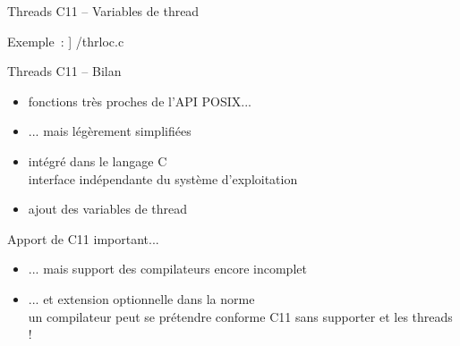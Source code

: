 \begin {frame} [fragile] {Threads C11 -- Variables de thread}

    Exemple~:
    \scriptsize\lstmonstyle] {\inc/thrloc.c}

\end{frame}

\begin {frame} {Threads C11 -- Bilan}
    \begin {itemize}
	\item fonctions très proches de l'API POSIX...
	\item ... mais légèrement simplifiées
	\item intégré dans le langage C \\
	    \implique interface indépendante du système d'exploitation
	\item ajout des variables de thread
    \end {itemize}

    \vspace* {3mm}

    Apport de C11 important...
    \begin {itemize}
	\item ... mais support des compilateurs encore incomplet
	\item ... et extension optionnelle dans la norme
	    \\
	    \implique un compilateur peut se prétendre conforme C11 sans
	    supporter  et les threads !
    \end {itemize}
\end {frame}
